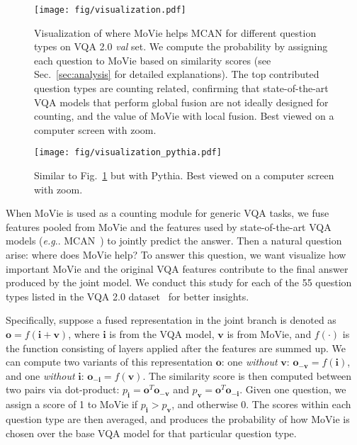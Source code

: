 \documentclass{article} \usepackage[dvipsnames,table]{xcolor}
\makeatletter
\def\rvi{{\mathbf{i}}}
\def\rvo{{\mathbf{o}}}
\def\rvv{{\mathbf{v}}}
\newcommand{\ours}[0]{MoVie\xspace}
\DeclareRobustCommand\onedot{\futurelet\@let@token\@onedot}
\def\@onedot{\ifx\@let@token.\else.\null\fi\xspace}
\def\eg{\emph{e.g}\onedot} \def\Eg{\emph{E.g}\onedot}
\makeatother
\begin{document}
\begin{figure}[t]
\centering
\texttt{[image: fig/visualization.pdf]}
\caption{Visualization of where \ours helps MCAN for different question types on VQA 2.0 \emph{val} set. We compute the probability by assigning each question to \ours based on similarity scores (see Sec.~\ref{sec:analysis} for detailed explanations). The top contributed question types are counting related, confirming that state-of-the-art VQA models that perform global fusion are not ideally designed for counting, and the value of \ours with local fusion. Best viewed on a computer screen with zoom.}
\label{fig:two_branch}
\end{figure}

\begin{figure}[!ht]
\centering
\texttt{[image: fig/visualization\_pythia.pdf]}
\caption{Similar to Fig.~\ref{fig:two_branch} but with Pythia. Best viewed on a computer screen with zoom.}
\label{fig:two_branch_pythia}
\end{figure}


When \ours is used as a counting module for generic VQA tasks, we fuse features pooled from \ours and the features used by state-of-the-art VQA models (\eg MCAN~\cite{yu2019deep}) to jointly predict the answer. Then a natural question arise: where does \ours help? To answer this question, we want visualize how important \ours and the original VQA features contribute to the final answer produced by the joint model. We conduct this study for each of the 55 question types listed in the VQA 2.0 dataset~\cite{antol2015vqa} for better insights. 

Specifically, suppose a fused representation in the joint branch is denoted as $\rvo {=} f(\rvi {+} \rvv)$, where $\rvi$ is from the VQA model, $\rvv$ is from \ours, and $f(\cdot)$ is the function consisting of layers applied after the features are summed up. We can compute two variants of this representation $\rvo$: one \emph{without} $\rvv$: $\rvo_{-\rvv} {=} f(\rvi)$, and one \emph{without} $\rvi$: $\rvo_{-\rvi} {=} f(\rvv)$. The similarity score is then computed between two pairs via dot-product: $p_{\rvi} {=} \rvo^T\rvo_{-\rvv}$ and $p_{\rvv} {=} \rvo^T\rvo_{-\rvi}$. Given one question, we assign a score of 1 to \ours if $p_{\rvi} {>} p_{\rvv}$, and otherwise 0. The scores within each question type are then averaged, and produces the probability of how \ours is chosen over the base VQA model for that particular question type.
\end{document}
